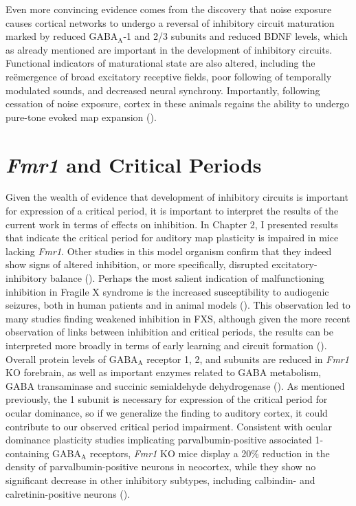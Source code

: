 Even more convincing evidence comes from the discovery that noise exposure causes cortical networks to undergo a reversal of inhibitory circuit maturation marked by reduced GABA$_\mathrm{A}$-\textalpha{}1 and \textbeta{}2/3 subunits and reduced BDNF levels, which as already mentioned are important in the development of inhibitory circuits. Functional indicators of maturational state are also altered, including the re\"emergence of broad excitatory receptive fields, poor following of temporally modulated sounds, and decreased neural synchrony. Importantly, following cessation of noise exposure, cortex in these animals regains the ability to undergo pure-tone evoked map expansion (\cite{Zhou2011}).

\section{\textit{Fmr1} and Critical Periods}
Given the wealth of evidence that development of inhibitory circuits is important for expression of a critical period, it is important to interpret the results of the current work in terms of effects on inhibition. In Chapter 2, I presented results that indicate the critical period for auditory map plasticity is impaired in mice lacking \textit{Fmr1}. Other studies in this model organism confirm that they indeed show signs of altered inhibition, or more specifically, disrupted excitatory-inhibitory balance (\cite{Gibson2008}). Perhaps the most salient indication of malfunctioning inhibition in Fragile X syndrome is the increased susceptibility to audiogenic seizures, both in human patients and in animal models (\cite{Hagerman, Chen2001}). This observation led to many studies finding weakened inhibition in FXS, although given the more recent observation of links between inhibition and critical periods, the results can be interpreted more broadly in terms of early learning and circuit formation (\cite{ElIdrissi2005}). Overall protein levels of GABA$_\mathrm{A}$ receptor \textalpha{}1, \textbeta{}2, and \textdelta{} subunits are reduced in \textit{Fmr1} KO forebrain, as well as important enzymes related to GABA metabolism, GABA transaminase and succinic semialdehyde dehydrogenase (\cite{Adusei2010}). As mentioned previously, the \textalpha{}1 subunit is necessary for expression of the critical period for ocular dominance, so if we generalize the finding to auditory cortex, it could contribute to our observed critical period impairment. Consistent with ocular dominance plasticity studies implicating parvalbumin-positive associated \textalpha{}1-containing GABA$_\mathrm{A}$ receptors, \textit{Fmr1} KO mice display a 20\% reduction in the density of parvalbumin-positive neurons in neocortex, while they show no significant decrease in other inhibitory subtypes, including calbindin- and calretinin-positive neurons (\cite{Selby2007}).

